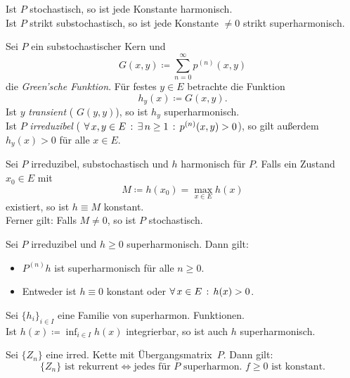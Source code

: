 \documentclass{cheat-sheet}
\begin{document}
\begin{bem}
  Ist $P$ stochastisch, so ist jede Konstante harmonisch. \\
  Ist $P$ strikt substochastisch, so ist jede Konstante $\neq 0$ strikt superharmonisch.
\end{bem}

\begin{bsp}
  Sei $P$ ein substochastischer Kern und
  \[ G(x, y) \coloneqq {\sum}_{n=0}^\infty p^{(n)}(x, y) \]
  die \textit{Green'sche Funktion}.
  Für festes $y \in E$ betrachte die Funktion
  \[ h_y(x) \coloneqq G(x, y). \]
  Ist $y$ \textit{transient} (\dh{} $G(y, y)$), so ist $h_y$ superharmonisch. \\
  Ist $P$ \textit{irreduzibel} (\dh{} $\forall \, {x, y \in E} \,:\, \exists \, {n \geq 1} \,:\, p^{(n)}(x, y) > 0$), so gilt außerdem $h_y(x) > 0$ für alle $x \in E$.
\end{bsp}

\begin{lem}
  Sei $P$ irreduzibel, substochastisch und $h$ harmonisch für $P$.
  Falls ein Zustand $x_0 \in E$ mit
  \[
    M \coloneqq h(x_0) = \max_{x \in E} h(x)
  \]
  existiert, so ist $h \equiv M$ konstant. \\
  Ferner gilt: Falls $M \neq 0$, so ist $P$ stochastisch.
\end{lem}

\begin{lem}
  Sei $P$ irreduzibel und $h \geq 0$ superharmonisch.
  Dann gilt:
  \begin{itemize}
    \item $P^{(n)} h$ ist superharmonisch für alle $n \geq 0$.
    \item Entweder ist $h \equiv 0$ konstant oder $\forall \, {x \in E} \,:\, h(x) > 0$.
  \end{itemize}
\end{lem}

\begin{lem}
  Sei $\{ h_i \}_{i \in I}$ eine Familie von superharmon. Funktionen. \\
  Ist $h(x) \coloneqq {\inf}_{i \in I} h(x)$ integrierbar, so ist auch $h$ superharmonisch.
\end{lem}

\begin{satz}
  Sei $\{ Z_n \}$ eine irred. Kette mit Übergangsmatrix~$P$.
  Dann gilt:
  \[
    \{ Z_n \} \text{ ist rekurrent} \iff
    \text{jedes für~$P$ superharmon. $f \geq 0$ ist konstant}.
  \]
\end{satz}
\end{document}
